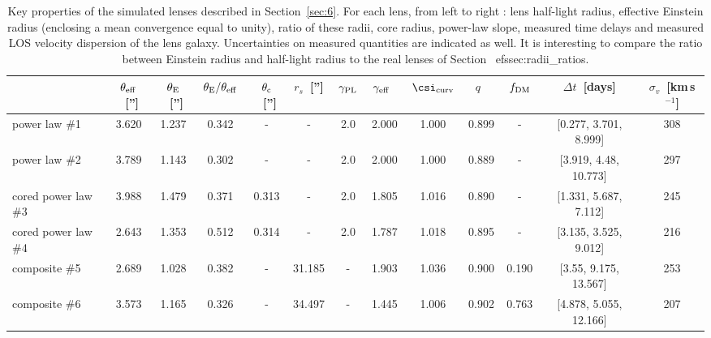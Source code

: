 \begin{table*}[htbp!]
\renewcommand{\arraystretch}{1.5}
\centering
\begin{tabular}{l|c|c|c|c|c|c|c|c|c|c|c|c}
\toprule
{} &  $\theta_{\rm eff}$\ [''] &  $\theta_{\rm E}$\ [''] &  $\theta_{\rm E} / \theta_{\rm eff}$\  &  $\theta_{\rm c}$\ [''] &  $r_{s}$\ [''] &  $\gamma_{\rm PL}$\  &  $\gamma_{\rm eff}$\  &  $\csi_{\rm curv}$\  &      $q$\  &  $f_{\rm DM}$\  &      $\Delta t$\ [days] &  $\sigma_v$\ [km\,s$^{-1}$] \\
\midrule
power law \#1       &                     3.620 &                   1.237 &                                  0.342 &                       - &              - &                  2.0 &                 2.000 &                1.000 &      0.899 &               - &   [0.277, 3.701, 8.999] &                         308 \\
power law \#2       &                     3.789 &                   1.143 &                                  0.302 &                       - &              - &                  2.0 &                 2.000 &                1.000 &      0.889 &               - &   [3.919, 4.48, 10.773] &                         297 \\
cored power law \#3 &                     3.988 &                   1.479 &                                  0.371 &                   0.313 &              - &                  2.0 &                 1.805 &                1.016 &      0.890 &               - &   [1.331, 5.687, 7.112] &                         245 \\
cored power law \#4 &                     2.643 &                   1.353 &                                  0.512 &                   0.314 &              - &                  2.0 &                 1.787 &                1.018 &      0.895 &               - &   [3.135, 3.525, 9.012] &                         216 \\
composite \#5       &                     2.689 &                   1.028 &                                  0.382 &                       - &         31.185 &                    - &                 1.903 &                1.036 &      0.900 &           0.190 &   [3.55, 9.175, 13.567] &                         253 \\
composite \#6       &                     3.573 &                   1.165 &                                  0.326 &                       - &         34.497 &                    - &                 1.445 &                1.006 &      0.902 &           0.763 &  [4.878, 5.055, 12.166] &                         207 \\
\bottomrule
\end{tabular}
\caption{Key properties of the simulated lenses described in Section~\ref{sec:6}. For each lens, from left to right : lens half-light radius, effective Einstein radius (enclosing a mean convergence equal to unity), ratio of these radii, core radius, power-law slope, measured time delays and measured LOS velocity dispersion of the lens galaxy. Uncertainties on measured quantities are indicated as well. It is interesting to compare the ratio between Einstein radius and half-light radius to the real lenses of Section~
ef{ssec:radii_ratios}. \label{app:mock_params}}
\end{table*}
